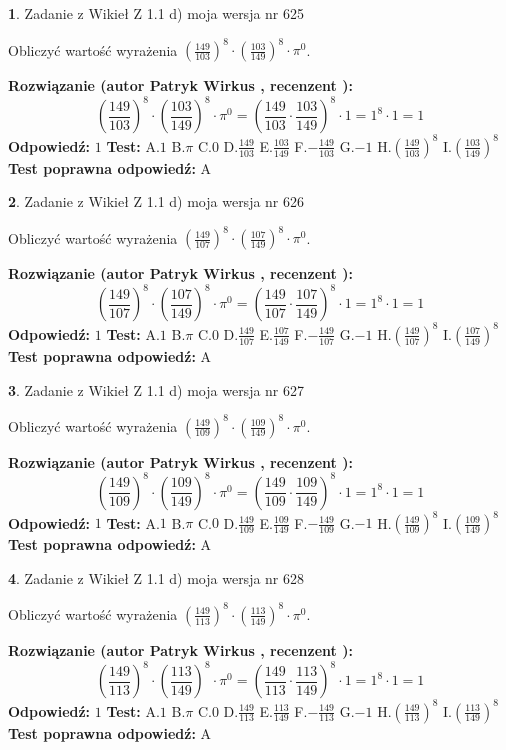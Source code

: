 \documentclass[12pt, a4paper]{article}
\theoremstyle{definition} %
\newtheorem{zad}{}
\newcommand{\zadStart}[1]{\begin{zad}#1\newline}
\newcommand{\zadStop}{\end{zad}}
\newcommand{\rozwStart}[2]{\noindent \textbf{Rozwiązanie (autor #1 , recenzent #2): }\newline}
\newcommand{\rozwStop}{\newline}
\newcommand{\odpStart}{\noindent \textbf{Odpowiedź:}\newline}
\newcommand{\odpStop}{\newline}
\newcommand{\testStart}{\noindent \textbf{Test:}\newline}
\newcommand{\testStop}{\newline}
\newcommand{\kluczStart}{\noindent \textbf{Test poprawna odpowiedź:}\newline}
\newcommand{\kluczStop}{\newline}
\begin{document}
\zadStart{Zadanie z Wikieł Z 1.1 d) moja wersja nr 625}

Obliczyć wartość wyrażenia $(\frac{149}{103})^{8} \cdot (\frac{103}{149})^{8} \cdot \pi^{0}$.
\zadStop
\rozwStart{Patryk Wirkus}{}
$$(\frac{149}{103})^{8} \cdot (\frac{103}{149})^{8} \cdot \pi^{0} = (\frac{149}{103} \cdot \frac{103}{149})^{8} \cdot 1 = 1^{8} \cdot 1 = 1$$
\rozwStop
\odpStart
$1$
\odpStop
\testStart
A.$1$ B.$\pi$ C.$0$ D.$\frac{149}{103}$ E.$\frac{103}{149}$
F.$-\frac{149}{103}$ G.$-1$
H.$(\frac{149}{103})^{8}$
I.$(\frac{103}{149})^{8}$
\testStop
\kluczStart
A
\kluczStop



\zadStart{Zadanie z Wikieł Z 1.1 d) moja wersja nr 626}

Obliczyć wartość wyrażenia $(\frac{149}{107})^{8} \cdot (\frac{107}{149})^{8} \cdot \pi^{0}$.
\zadStop
\rozwStart{Patryk Wirkus}{}
$$(\frac{149}{107})^{8} \cdot (\frac{107}{149})^{8} \cdot \pi^{0} = (\frac{149}{107} \cdot \frac{107}{149})^{8} \cdot 1 = 1^{8} \cdot 1 = 1$$
\rozwStop
\odpStart
$1$
\odpStop
\testStart
A.$1$ B.$\pi$ C.$0$ D.$\frac{149}{107}$ E.$\frac{107}{149}$
F.$-\frac{149}{107}$ G.$-1$
H.$(\frac{149}{107})^{8}$
I.$(\frac{107}{149})^{8}$
\testStop
\kluczStart
A
\kluczStop



\zadStart{Zadanie z Wikieł Z 1.1 d) moja wersja nr 627}

Obliczyć wartość wyrażenia $(\frac{149}{109})^{8} \cdot (\frac{109}{149})^{8} \cdot \pi^{0}$.
\zadStop
\rozwStart{Patryk Wirkus}{}
$$(\frac{149}{109})^{8} \cdot (\frac{109}{149})^{8} \cdot \pi^{0} = (\frac{149}{109} \cdot \frac{109}{149})^{8} \cdot 1 = 1^{8} \cdot 1 = 1$$
\rozwStop
\odpStart
$1$
\odpStop
\testStart
A.$1$ B.$\pi$ C.$0$ D.$\frac{149}{109}$ E.$\frac{109}{149}$
F.$-\frac{149}{109}$ G.$-1$
H.$(\frac{149}{109})^{8}$
I.$(\frac{109}{149})^{8}$
\testStop
\kluczStart
A
\kluczStop



\zadStart{Zadanie z Wikieł Z 1.1 d) moja wersja nr 628}

Obliczyć wartość wyrażenia $(\frac{149}{113})^{8} \cdot (\frac{113}{149})^{8} \cdot \pi^{0}$.
\zadStop
\rozwStart{Patryk Wirkus}{}
$$(\frac{149}{113})^{8} \cdot (\frac{113}{149})^{8} \cdot \pi^{0} = (\frac{149}{113} \cdot \frac{113}{149})^{8} \cdot 1 = 1^{8} \cdot 1 = 1$$
\rozwStop
\odpStart
$1$
\odpStop
\testStart
A.$1$ B.$\pi$ C.$0$ D.$\frac{149}{113}$ E.$\frac{113}{149}$
F.$-\frac{149}{113}$ G.$-1$
H.$(\frac{149}{113})^{8}$
I.$(\frac{113}{149})^{8}$
\testStop
\kluczStart
A
\kluczStop
\end{document}
